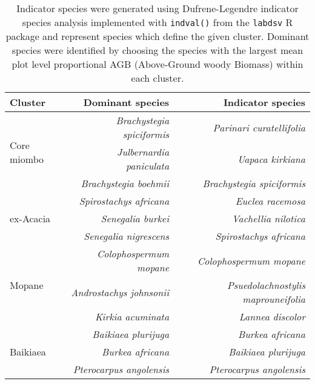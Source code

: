 \begin{table}[tb]
	\caption[Floristic description of vegetation types]{Indicator species were generated using Dufrene-Legendre indicator species analysis \citep{Dufrene1997} implemented with \texttt{indval()} from the \texttt{labdsv} R package \citep{labdsv} and represent species which define the given cluster. Dominant species were identified by choosing the species with the largest mean plot level proportional AGB (Above-Ground woody Biomass) within each cluster.} 
	\label{befr:clust_ind} 
\begin{tabular}{lrr} 
  \toprule
{Cluster} & {Dominant species} & {Indicator species} \\
\midrule
\multirow{3}{*}{Core miombo} & \textit{Brachystegia spiciformis} & \textit{Parinari curatellifolia} \\
 & \textit{Julbernardia paniculata} & \textit{Uapaca kirkiana} \\
 & \textit{Brachystegia boehmii} & \textit{Brachystegia spiciformis} \\  
\midrule 
\multirow{3}{*}{ex-Acacia} & \textit{Spirostachys africana} & \textit{Euclea racemosa} \\
 & \textit{Senegalia burkei} & \textit{Vachellia nilotica}\\
 & \textit{Senegalia nigrescens} & \textit{Spirostachys africana} \\
\midrule
\multirow{3}{*}{Mopane} & \textit{Colophospermum mopane} & \textit{Colophospermum mopane} \\
 & \textit{Androstachys johnsonii} & \textit{Psuedolachnostylis maprouneifolia} \\
 & \textit{Kirkia acuminata} & \textit{Lannea discolor} \\ 
\midrule
\multirow{3}{*}{Baikiaea} & \textit{Baikiaea plurijuga} & \textit{Burkea africana} \\
 & \textit{Burkea africana} & \textit{Baikiaea plurijuga} \\
 & \textit{Pterocarpus angolensis} & \textit{Pterocarpus angolensis} \\
\bottomrule
\end{tabular} 
\end{table} 
